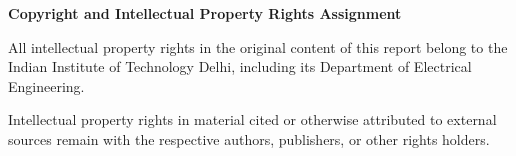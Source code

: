 \clearpage
\thispagestyle{ell305}
\vspace*{0.16\textheight}

\begin{center}
  {\Large\bfseries Copyright and Intellectual Property Rights Assignment\par}
\end{center}

\vspace{1.2cm}

All intellectual property rights in the original content of this report belong to the Indian Institute of Technology Delhi, including its Department of Electrical Engineering.

Intellectual property rights in material cited or otherwise attributed to external sources remain with the respective authors, publishers, or other rights holders.

\vfill

\begin{flushright}
  \authorone\\
  \authortwo\\
  \authorthree\\[0.5em]
  \draftdate
\end{flushright}
